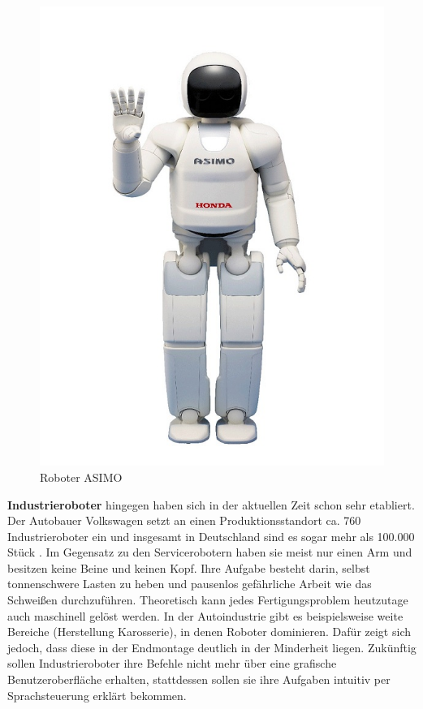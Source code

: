 \begin{figure}[H]						
	\centering							
	\includegraphics[scale=0.5]{Bilder/asimo.jpg}			
	\caption{Roboter ASIMO}						
	\label{f:asimo}						
\end{figure}

\textbf{Industrieroboter} hingegen haben sich in der aktuellen Zeit schon sehr etabliert. Der Autobauer Volkswagen setzt an einen Produktionsstandort ca. 760 Industrieroboter ein und insgesamt in Deutschland sind es sogar mehr als 100.000 Stück \cite{Haun2007}. Im Gegensatz zu den Servicerobotern haben sie meist nur einen Arm und besitzen keine Beine und keinen Kopf. Ihre Aufgabe besteht darin, selbst tonnenschwere Lasten zu heben und pausenlos gefährliche Arbeit wie das Schweißen durchzuführen. 
Theoretisch kann jedes Fertigungsproblem heutzutage auch maschinell gelöst werden. In der Autoindustrie gibt es beispielsweise weite Bereiche (Herstellung Karosserie), in denen Roboter dominieren. Dafür zeigt sich jedoch, dass diese in der Endmontage deutlich in der Minderheit liegen. Zukünftig sollen Industrieroboter ihre Befehle nicht mehr über eine grafische Benutzeroberfläche erhalten, stattdessen sollen sie ihre Aufgaben intuitiv per Sprachsteuerung erklärt bekommen\cite{Haun2007}.

